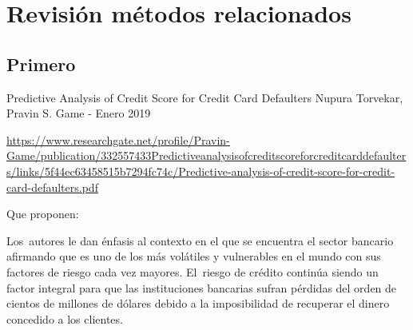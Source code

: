\documentclass[12pt]{report}
\renewcommand{\_}{\kern-1.5pt\textunderscore\kern-1.5pt}
\begin{document}
\vspace{\baselineskip}

\vspace{\baselineskip}

\vspace{\baselineskip}

\vspace{\baselineskip}

\vspace{\baselineskip}

\vspace{\baselineskip}

\vspace{\baselineskip}

\vspace{\baselineskip}

\vspace{\baselineskip}
\section{Revisión métodos relacionados}

\vspace{\baselineskip}
\subsection{Primero}
Predictive Analysis of Credit Score for Credit Card Defaulters
Nupura Torvekar, Pravin S. Game - Enero 2019

\vspace{\baselineskip}
\href{https://www.researchgate.net/profile/Pravin-Game/publication/332557433_Predictive_analysis_of_credit_score_for_credit_card_defaulters/links/5f44ec63458515b7294fc74c/Predictive-analysis-of-credit-score-for-credit-card-defaulters.pdf}{\textcolor[HTML]{1155CC}{\ul{https://www.researchgate.net/profile/Pravin-Game/publication/332557433\_Predictive\_analysis\_of\_credit\_score\_for\_credit\_card\_defaulters/links/5f44ec63458515b7294fc74c/Predictive-analysis-of-credit-score-for-credit-card-defaulters.pdf}}}

\vspace{\baselineskip}
Que proponen: 

\vspace{\baselineskip}
Los\ autores le dan énfasis al contexto en el que se encuentra el sector bancario afirmando que  es uno de los más volátiles y vulnerables en el mundo con sus factores de riesgo cada vez mayores.
El\ riesgo de crédito continúa siendo un factor integral para que las instituciones bancarias  sufran pérdidas del orden de cientos de millones de dólares debido a la imposibilidad de recuperar el dinero concedido a los clientes.
\end{document}
